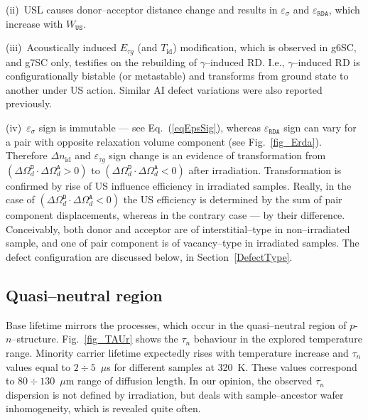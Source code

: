 \documentclass[aip,jap, amsmath,amssymb,reprint]{revtex4-1}
\begin{document}
\noindent
(ii)~USL causes donor--acceptor distance change and results in $\varepsilon_{\sigma}$ and $\varepsilon_{\mathtt{RDA}}$,
which increase with $W_{\mathtt{US}}$.

\noindent
(iii)~Acoustically induced $E_{\tau g}$ (and $T_{\mathrm{id}}$) modification, which is observed in g6SC, and g7SC only,
testifies on the rebuilding of  $\gamma$--induced RD.
I.e., $\gamma$--induced RD is conﬁgurationally bistable (or metastable) and transforms from ground state to another under US action.
Similar AI defect variations were also reported previously.\cite{Wosinski,Ostapenko1994,Olikh2009Sem,YOlikhTPL2011}

\noindent
(iv)~$\varepsilon_{\sigma}$ sign is immutable --- see Eq.~(\ref{eqEpsSig}),
whereas $\varepsilon_{\mathtt{RDA}}$ sign can vary for a pair with opposite relaxation volume component (see Fig.~\ref{fig_Erda}).
Therefore $\Delta n_{\mathrm{id}}$ and $\varepsilon_{\tau g}$ sign change is an evidence of transformation
from $(\Delta\Omega_d^\mathtt{D}\cdot\Delta\Omega_d^\mathtt{A}>0)$  to
$(\Delta\Omega_d^\mathtt{D}\cdot\Delta\Omega_d^\mathtt{A}<0)$  after irradiation.
Transformation is confirmed by rise of US influence efficiency in irradiated samples.
Really, in the case of $(\Delta\Omega_d^\mathtt{D}\cdot\Delta\Omega_d^\mathtt{A}<0)$ the US efficiency is determined by the sum of pair component displacements,
whereas in the contrary case  --- by their difference.
Conceivably, both donor and acceptor are of interstitial--type in non--irradiated sample, and one of pair component is of vacancy--type in irradiated samples.
The defect configuration are discussed below, in Section~\ref{DefectType}.


\subsection{Quasi--neutral region\label{Base}}

Base lifetime mirrors the processes, which occur in the quasi--neutral region  of $p$-$n$--structure.
Fig.~\ref{fig_TAUr} shows the  $\tau_n$  behaviour in the explored temperature range.
Minority carrier lifetime expectedly rises with temperature increase and
$\tau_n$ values equal to $2\div5$~$\mu$s for different samples at 320~K.
These values correspond to $80\div130$~$\mu$m range of diffusion length.
In our opinion, the observed $\tau_n$ dispersion is not defined by irradiation, but deals with sample--ancestor wafer inhomogeneity, which is revealed
quite often.\cite{Oxide:Chen,Oxide_Schon}
\end{document}
